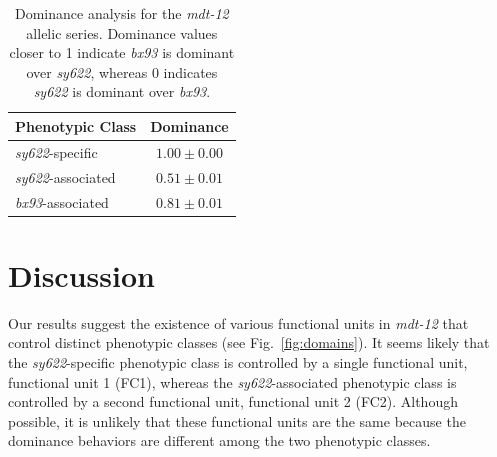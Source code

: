 \documentclass[8pt, twocolumn]{article}
\newcommand{\gene}[1]{\mbox{\emph{#1}}}
\newcommand{\dpy}{\gene{mdt-12}}
\begin{document}
\begin{table}
  \begin{tabular}{lc}
    \toprule
    Phenotypic Class & Dominance\\
    \midrule
    \emph{sy622}-specific & $1.00\pm0.00$\\
    \emph{sy622}-associated & $0.51\pm0.01$\\
    \emph{bx93}-associated & $0.81\pm0.01$\\
    \bottomrule
  \end{tabular}
  \caption{Dominance analysis for the \dpy{} allelic series. Dominance values
  closer to 1 indicate \emph{bx93} is dominant over \emph{sy622}, whereas 0
  indicates \emph{sy622} is dominant over \emph{bx93}.}
\label{tab:dom}

\end{table}




\section*{Discussion}
\label{sec:conclusions}
Our results suggest the existence of various functional units in \dpy{}
that control distinct phenotypic classes (see Fig.~\ref{fig:domains}). It seems
likely that the \emph{sy622}-specific phenotypic class is controlled by a single
functional unit, functional unit 1 (FC1), whereas the \emph{sy622}-associated
phenotypic class is controlled by a second functional unit, functional unit 2
(FC2). Although possible, it is unlikely that these functional units are
the same because the dominance behaviors are different among the two phenotypic
classes.
\end{document}
